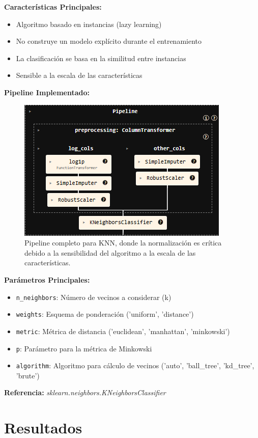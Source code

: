 \documentclass{article}
\begin{document}
\textbf{Características Principales:}
\begin{itemize}
    \item Algoritmo basado en instancias (lazy learning)
    \item No construye un modelo explícito durante el entrenamiento
    \item La clasificación se basa en la similitud entre instancias
    \item Sensible a la escala de las características
\end{itemize}

\textbf{Pipeline Implementado:}
\begin{figure}[H]
    \centering
    \includegraphics[width=0.4\linewidth]{pipeline_knn.png}
    \caption{Pipeline completo para KNN, donde la normalización es crítica debido a la sensibilidad del algoritmo a la escala de las características.}
    \label{fig:pipeline_knn}
\end{figure}

\textbf{Parámetros Principales:}
\begin{itemize}
    \item \texttt{n\_neighbors}: Número de vecinos a considerar (k)
    \item \texttt{weights}: Esquema de ponderación ('uniform', 'distance')
    \item \texttt{metric}: Métrica de distancia ('euclidean', 'manhattan', 'minkowski')
    \item \texttt{p}: Parámetro para la métrica de Minkowski
    \item \texttt{algorithm}: Algoritmo para cálculo de vecinos ('auto', 'ball\_tree', 'kd\_tree', 'brute')
\end{itemize}

\textbf{Referencia:} \textit{sklearn.neighbors.KNeighborsClassifier} \cite{sklearn_knn}

\newpage

\section{Resultados}
\end{document}
